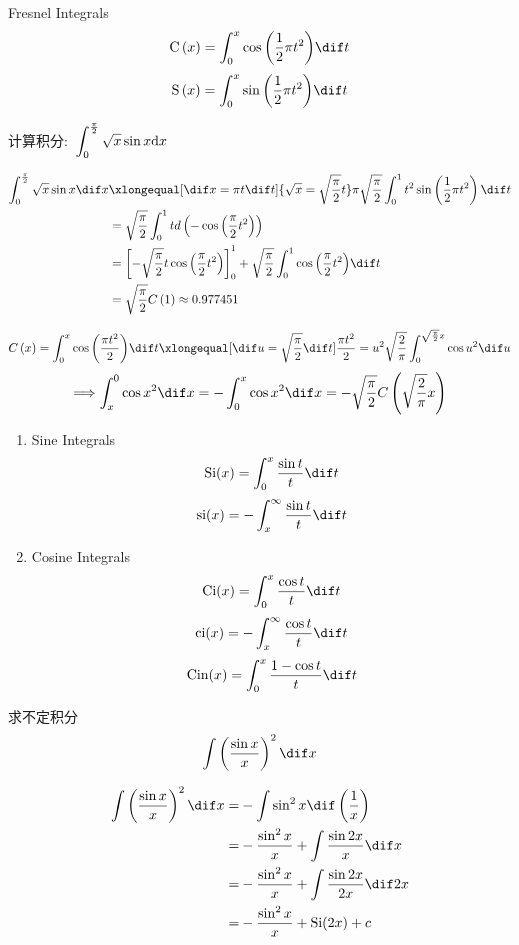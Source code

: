 \documentclass[color=green,titlestyle=hang]{elegantbook}%
\begin{document}
\begin{newdef}[菲涅尔积分函数]
Fresnel Integrals\[{\rm C}\left( x \right) = \int_0^x {\cos \left( {\frac{1}{2}\pi {t^2}} \right)} \dif t\]
\[{\rm S}\left( x \right) = \int_0^x {\sin \left( {\frac{1}{2}\pi {t^2}} \right)} \dif t\]
\end{newdef}

\begin{example}计算积分:~$\displaystyle \int_{\rm{0}}^{\frac{\pi }{{\rm{2}}}} {\sqrt x \sin x} \textrm{d}x$\end{example}
\begin{Solution}\begin{align*}
\int_{0}^{\frac{\pi }{{\rm{2}}}} {\sqrt x \sin x} \dif x &\xlongequal[\dif x = \pi t\dif t]{\sqrt x  = \sqrt {\frac{\pi }{2}} t} \pi \sqrt {\frac{\pi }{2}} \int_0^1 {{t^2}\sin } \left( {\frac{1}{2}\pi {t^2}} \right)\dif t\\
&= \sqrt {\frac{\pi }{2}} \int_0^1 t d\left( { - \cos \left( {\frac{\pi }{2}{t^2}} \right)} \right)\\
&= \left[ { - \sqrt {\frac{\pi }{2}} t\cos \left( {\frac{\pi }{2}{t^2}} \right)} \right]_0^1 + \sqrt {\frac{\pi }{2}} \int_0^1 {\cos \left( {\frac{\pi }{2}{t^2}} \right)} \dif t\\
&= \sqrt {\frac{\pi }{2}} C\left( 1 \right) \approx 0.977451\end{align*}	
\end{Solution}\[C\left( x \right) = \int_0^x {\cos \left( {\frac{{\pi {t^2}}}{2}} \right)} \dif t \xlongequal[{\dif u = \sqrt {\frac{\pi }{2}} \dif t}]{{\frac{{\pi {t^2}}}{2} = {u^2}}}\sqrt {\frac{2}{\pi }} \int_0^{\sqrt {\frac{\pi }{2}} x} {\cos {u^2}\dif u} \]
\[ \Longrightarrow \int_x^0 {\cos {x^2}} \dif x =  - \int_0^x {\cos {x^2}} \dif x =  - \sqrt {\frac{\pi }{2}} C\left( {\sqrt {\frac{2}{\pi }} x} \right)
\]

\begin{newdef}[三角积分函数]
\begin{enumerate}
	\item Sine Integrals \[{\rm Si}(x)=\int_0^x\frac{\sin t}{t}\dif t\]
	\[{\rm si}(x)=-\int_{x}^{\infty}\frac{\sin t}{t}\dif t\]
	\item Cosine Integrals \[{\rm Ci}(x)=\int_0^x\frac{\cos t}{t}\dif t\]
	\[{\rm ci}(x)=-\int_x^{\infty}\frac{\cos t}{t}\dif t\]
	\[{\rm Cin}(x)=\int_0^x\frac{1-\cos t}{t}\dif t\]
\end{enumerate}	
\end{newdef}

\begin{example}求不定积分\[\int\left(\frac{\sin x}{x}\right)^2\dif x\]
\end{example}\begin{Solution}\begin{align*}\int\left(\frac{\sin x}{x}\right)^2\dif x
=&-\int\sin^2x \dif \left(\frac{1}{x}\right)\\
=&-\frac{\sin^2x}{x}+\int\frac{\sin{2x}}{x}\dif x\\
=&-\frac{\sin^2x}{x}+\int\frac{\sin{2x}}{2x}\dif 2x\\
=&-\frac{\sin^2x}{x}+\mathrm{Si}(2x)+c
\end{align*}
\end{Solution}
\end{document}

